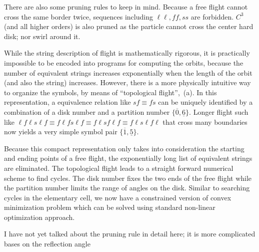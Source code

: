 There are also some pruning rules to keep in mind. Because a free flight
cannot cross the same border twice, sequences including $\ell\ell,ff,ss$
are forbidden. $C^3$ (and all higher orders) is also pruned as the
particle cannot cross the center hard disk; nor swirl around it.

While the string description of flight is mathematically rigorous, it is
practically impossible to be encoded into programs for computing the orbits,
because the number of equivalent strings increases exponentially when the length
of the orbit (and also the string) increases. However, there is a more
physically intuitive way to organize the symbols, by means of ``topological
flight'', \,(a). In this representation, a equivalence
relation like $sf\equiv fs$ can be uniquely identified by a combination of a
disk number and a partition number $\{\overline{0},\underline{6}\}$. Longer
flight such like $\ell f \ell s \ell f \equiv  f \ell f s \ell f \equiv f \ell s
f \ell f \equiv f \ell s \ell f \ell$ that cross many boundaries now yields a
very simple symbol pair $\{\overline{1},\underline{5}\}$. 

Because this compact representation only takes into consideration the starting
and ending points of a free flight, the exponentially long list of equivalent
strings are eliminated. The topological flight leads to a straight forward
numerical scheme to find cycles. The disk number fixes the two ends of the free
flight while the partition number limits the range of angles on the disk.
Similar to searching cycles in the elementary cell, we now have a constrained
version of convex minimization problem which can be solved using standard
non-linear optimization approach.



    {I have not yet talked about the pruning rule in detail here; it is
    more complicated bases on the reflection angle}
